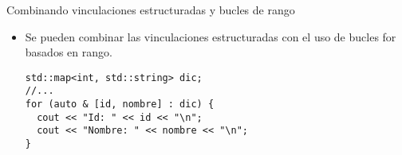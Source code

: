 \begin{frame}[t,fragile]{Combinando vinculaciones estructuradas y bucles de rango}
\begin{itemize}
  \item Se pueden combinar las vinculaciones estructuradas con el uso
        de bucles for basados en rango.
\begin{lstlisting}
std::map<int, std::string> dic;
//...
for (auto & [id, nombre] : dic) {
  cout << "Id: " << id << "\n";
  cout << "Nombre: " << nombre << "\n";
}
\end{lstlisting}
\end{itemize}
\end{frame}
